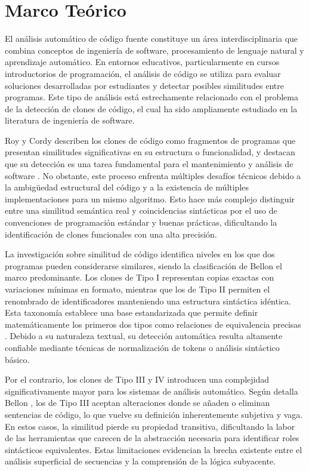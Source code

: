\chapter{Marco Teórico}

El análisis automático de código fuente constituye un área interdisciplinaria que combina conceptos de ingeniería de software, procesamiento de lenguaje natural y aprendizaje automático. En entornos educativos, particularmente en cursos introductorios de programación, el análisis de código se utiliza para evaluar soluciones desarrolladas por estudiantes y detectar posibles similitudes entre programas. Este tipo de análisis está estrechamente relacionado con el problema de la detección de clones de código, el cual ha sido ampliamente estudiado en la literatura de ingeniería de software.

Roy y Cordy describen los clones de código como fragmentos de programas que presentan similitudes significativas en su estructura o funcionalidad, y destacan que su detección es una tarea fundamental para el mantenimiento y análisis de software \cite{Roy2007Survey}. No obstante, este proceso enfrenta múltiples desafíos técnicos debido a la ambigüedad estructural del código y a la existencia de múltiples implementaciones para un mismo algoritmo. Esto hace más complejo distinguir entre una similitud semántica real y coincidencias sintácticas por el uso de convenciones de programación estándar y buenas prácticas, dificultando la identificación de clones funcionales con una alta precisión.

La investigación sobre similitud de código identifica niveles en los que dos programas pueden considerarse similares, siendo la clasificación de Bellon \cite{Bellon2007Comparison} el marco predominante. Los clones de Tipo I representan copias exactas con variaciones mínimas en formato, mientras que los de Tipo II permiten el renombrado de identificadores manteniendo una estructura sintáctica idéntica. Esta taxonomía establece una base estandarizada que permite definir matemáticamente los primeros dos tipos como relaciones de equivalencia precisas \cite{Bellon2007Comparison}. Debido a su naturaleza textual, su detección automática resulta altamente confiable mediante técnicas de normalización de tokens o análisis sintáctico básico.

Por el contrario, los clones de Tipo III y IV introducen una complejidad significativamente mayor para los sistemas de análisis automático. Según detalla Bellon \cite{Bellon2007Comparison}, los de Tipo III aceptan alteraciones donde se añaden o eliminan sentencias de código, lo que vuelve su definición inherentemente subjetiva y vaga. En estos casos, la similitud pierde su propiedad transitiva, dificultando la labor de las herramientas que carecen de la abstracción necesaria para identificar roles sintácticos equivalentes. Estas limitaciones evidencian la brecha existente entre el análisis superficial de secuencias y la comprensión de la lógica subyacente.

